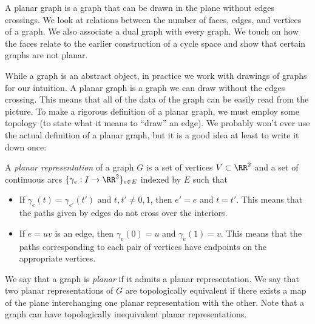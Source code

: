 
\begin{elevator}[Planarity]
A planar graph is a graph that can be drawn in the plane without edges crossings. We look at relations between the number of faces, edges, and vertices of a graph. 
We also associate a dual graph with every graph. 
We touch on how the faces relate to the earlier construction of a cycle space and show that certain graphs are not planar. 
\label{sec:planar:planar}
\end{elevator}

While a graph is an abstract object, in practice we work with drawings of graphs for our intuition. A planar graph is a graph we can draw without the edges crossing. 
This means that all of the data of the graph can be easily read from the picture.
To make a rigorous definition of a planar graph, we must employ some topology (to state what it means to ``draw'' an edge).
We probably won't ever use the actual definition of a planar graph, but it is a good idea at least to write it down once:
\begin{definition}
 A \emph{planar representation} of a graph $G$ is a set of vertices $V\subset \RR^2$ and a set of continuous arcs $\{\gamma_e: I\to \RR^2\}_{e\in E}$ indexed by $E$ such that
 \begin{itemize}
  \item 
    If $\gamma_{e}(t)=\gamma_{e'}(t')$ and $t, t'\neq 0,1$,  then $e'=e$ and $t=t'$. 
    This means that the paths given by edges do not cross over the interiors.  
  \item 
    If $e=uv$ is an edge, then $\gamma_{e}(0)=u$ and $\gamma_{e}(1)=v$. 
    This means that the paths corresponding to each pair of vertices have endpoints on the appropriate vertices.
 \end{itemize}
\end{definition}
We say that a graph is \emph{planar} if it admits a planar representation. We say that two planar representations of $G$ are topologically equivalent if there exists a map of the plane interchanging one planar representation with the other.
Note that a graph can have topologically inequivalent planar representations. 

